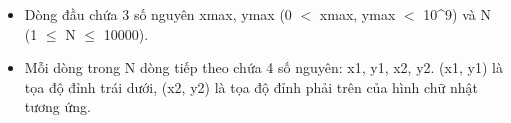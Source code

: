 \begin{itemize}
	\item Dòng đầu chứa 3 số nguyên xmax, ymax (0 $<$ xmax, ymax $<$ 10^9) và N (1  $\le$  N  $\le$  10000).
	\item Mỗi dòng trong N dòng tiếp theo chứa 4 số nguyên: x1, y1, x2, y2. (x1, y1) là tọa độ đỉnh trái dưới, (x2, y2) là tọa độ đỉnh phải trên của hình chữ nhật tương ứng.
\end{itemize}
